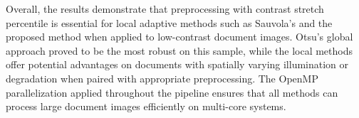 Overall, the results demonstrate that preprocessing with contrast stretch percentile is essential for local adaptive methods such as Sauvola's and the proposed method when applied to low-contrast document images. Otsu's global approach proved to be the most robust on this sample, while the local methods offer potential advantages on documents with spatially varying illumination or degradation when paired with appropriate preprocessing. The OpenMP parallelization applied throughout the pipeline ensures that all methods can process large document images efficiently on multi-core systems.

